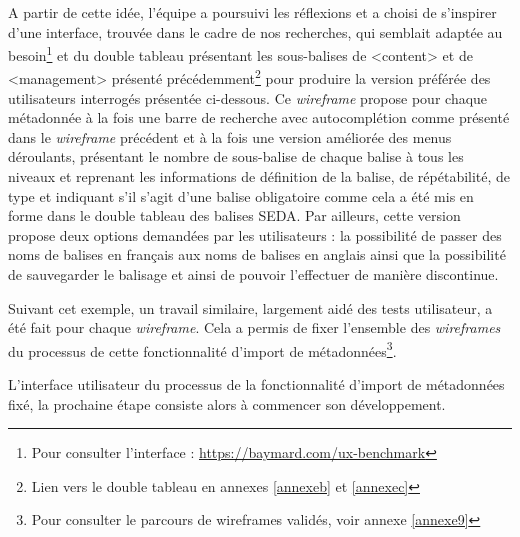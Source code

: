 \clearpage



A partir de cette idée, l’équipe a poursuivi les réflexions et a choisi de s’inspirer d'une interface, trouvée dans le cadre de nos recherches, qui semblait adaptée au besoin\footnote{Pour consulter l’interface : \href{https://baymard.com/ux-benchmark}{https://baymard.com/ux-benchmark}} et du double tableau présentant les sous-balises de <content> et de <management> présenté précédemment\footnote{Lien vers le double tableau en annexes \ref{annexeb} et \ref{annexec}} pour produire la version préférée des utilisateurs interrogés présentée ci-dessous. Ce \textit{\gls{wireframe}} propose pour chaque métadonnée à la fois une barre de recherche avec autocomplétion comme présenté dans le  \textit{\gls{wireframe}} précédent et à la fois une version améliorée des menus déroulants, présentant le nombre de sous-balise de chaque balise à tous les niveaux et reprenant les informations de définition de la balise, de répétabilité, de type et indiquant s’il s’agit d’une balise obligatoire comme cela a été mis en forme dans le double tableau des balises \gls{SEDA}. Par ailleurs, cette version propose deux options demandées par les utilisateurs : la possibilité de passer des noms de balises en français aux noms de balises en anglais ainsi que la possibilité de sauvegarder le balisage et ainsi de pouvoir l’effectuer de manière discontinue. 

\clearpage



\clearpage

Suivant cet exemple, un travail similaire, largement aidé des tests utilisateur, a été fait pour chaque \textit{\gls{wireframe}}. Cela a permis de fixer l’ensemble des \textit{\gls{wireframe}s} du processus de cette fonctionnalité d’import de métadonnées\footnote{Pour consulter le parcours de wireframes validés, voir annexe \ref{annexe9}}.

L’interface utilisateur du processus de la fonctionnalité d’import de métadonnées fixé, la prochaine étape consiste alors à commencer son développement. 
